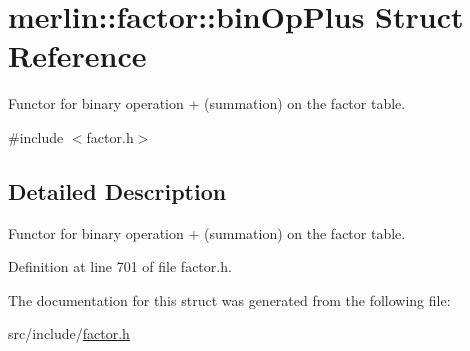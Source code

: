 \hypertarget{structmerlin_1_1factor_1_1binOpPlus}{}\section{merlin\+:\+:factor\+:\+:bin\+Op\+Plus Struct Reference}
\label{structmerlin_1_1factor_1_1binOpPlus}


Functor for binary operation + (summation) on the factor table.  




{\ttfamily \#include $<$factor.\+h$>$}



\subsection{Detailed Description}
Functor for binary operation + (summation) on the factor table. 

Definition at line 701 of file factor.\+h.



The documentation for this struct was generated from the following file\+:\begin{DoxyCompactItemize}
\item 
src/include/\hyperlink{factor_8h}{factor.\+h}\end{DoxyCompactItemize}

